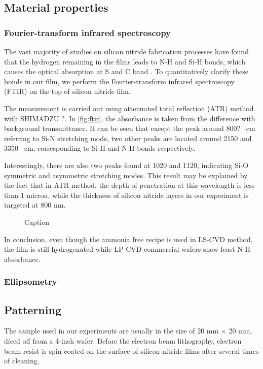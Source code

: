 \subsection{Material properties}

\subsubsection{Fourier-transform infrared spectroscopy}
The vast majority of studies on silicon nitride fabrication processes have found that the hydrogen remaining in the films leads to N-H and Si-H bonds, which causes the optical absorption at S and C band \cites{Ay2004, Agnihotri2000}. To quantitatively clarify these bonds in our film, we perform the Fourier-transform infrared spectroscopy (FTIR) on the top of silicon nitride film.

The measurement is carried out using attenuated total reflection (ATR) method with SHIMADZU ?. In \autoref{fig:ftir}, the absorbance is taken from the difference with background transmittance. It can be seen that except the peak around 800? \si{\per\cm} referring to Si-N stretching mode, two other peaks are located around 2150 and 3350 \si{\per\cm}, corresponding to Si-H and N-H bonds respectively.

Interestingly, there are also two peaks found at 1020 and 1120, indicating Si-O symmetric and asymmetric stretching modes. This result may be explained by the fact that in ATR method, the depth of penetration at this wavelength is less than 1 micron, while the thickness of silicon nitride layers in our experiment is targeted at 800 nm.


\begin{figure}
    \centering
    
    \caption{Caption}
    \label{fig:ftir}
\end{figure}

In conclusion, even though the ammonia free recipe is used in LS-CVD method, the film is still hydrogenated while LP-CVD commercial wafers show least N-H absorbance.

\subsubsection{Ellipsometry}


\subsection{Patterning}
The sample used in our experiments are usually in the size of 20 mm $\times$ 20 mm, diced off from a 4-inch wafer. Before the electron beam lithography, electron beam resist is spin-coated on the surface of silicon nitride films after several times of cleaning. 

